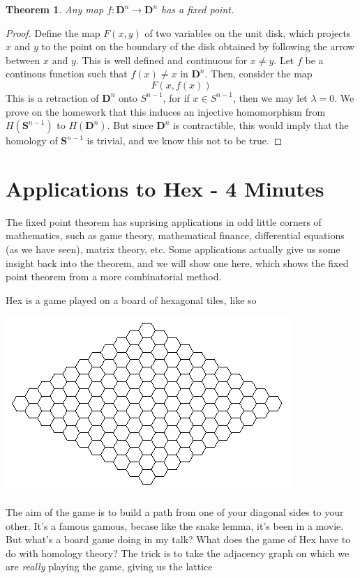 \documentclass{article}
\theoremstyle{plain}
\newtheorem{theorem}{Theorem}
\begin{document}
\begin{theorem}
    Any map $f: \mathbf{D}^n \to \mathbf{D}^n$ has a fixed point.
\end{theorem}
\begin{proof}
Define the map $F(x,y)$ of two variables on the unit disk, which projects $x$ and $y$ to the point on the boundary of the disk obtained by following the arrow between $x$ and $y$. This is well defined and continuous for $x \neq y$. Let $f$ be a continous function such that $f(x) \neq x$ in $\mathbf{D}^n$. Then, consider the map
%
\[ F(x,f(x)) \]
%
This is a retraction of $\mathbf{D}^n$ onto $S^{n-1}$, for if $x \in S^{n-1}$, then we may let $\lambda = 0$. We prove on the homework that this induces an injective homomorphism from $H(\mathbf{S}^{n-1})$ to $H(\mathbf{D}^n)$. But since $\mathbf{D}^n$ is contractible, this would imply that the homology of $\mathbf{S}^{n-1}$ is trivial, and we know this not to be true.
\end{proof}

\section{Applications to Hex - 4 Minutes}

The fixed point theorem has suprising applications in odd little corners of mathematics, such as game theory, mathematical finance, differential equations (as we have seen), matrix theory, etc. Some applications actually give us some insight back into the theorem, and we will show one here, which shows the fixed point theorem from a more combinatorial method.

Hex is a game played on a board of hexagonal tiles, like so
%
\begin{center}
\includegraphics[scale=0.4]{hex}
\end{center}
%
The aim of the game is to build a path from one of your diagonal sides to your other. It's a famous gamous, becase like the snake lemma, it's been in a movie. But what's a board game doing in my talk? What does the game of Hex have to do with homology theory? The trick is to take the adjacency graph on which we are {\it really} playing the game, giving us the lattice
\end{document}
